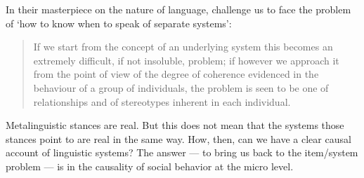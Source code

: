 In their masterpiece on the nature of language, \citet[8-9]{le_page_acts_1985} challenge us to face the problem of \textquoteleft how to 
know when to speak of separate systems': 



\begin{quotation}
If we start from the concept of an underlying system this becomes an 
extremely difficult, if not insoluble, problem; if however we approach 
it from the point of view of the degree of coherence evidenced in the 
behaviour of a group of individuals, the problem is seen to be one of 
relationships and of stereotypes inherent in each individual.  
\end{quotation}




Metalinguistic stances are real. But this does not mean that the systems 
those stances point to are real in the same way. How, then, can we have a clear 
causal account of linguistic systems? The answer --- to bring us back to the 
item/system problem --- is in the causality of social behavior at the micro 
level.





